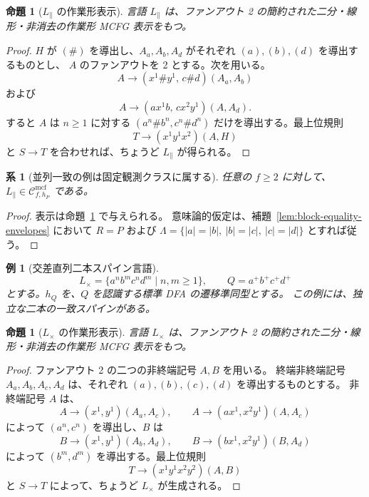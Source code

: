 \documentclass[11pt,a4paper]{ltjsarticle}
\newtheorem{proposition}[theorem]{命題}
\newtheorem{corollary}[theorem]{系}
\newtheorem{example}[theorem]{例}
\theoremstyle{remark}
\newcommand{\Cmcf}[2]{\mathcal{C}^{\mathrm{mcf}}_{#1,#2}}
\begin{document}
\begin{proposition}[\(L_{\parallel}\) の作業形表示]
\label{prop:parallel-running-example}
言語 \(L_{\parallel}\) は、ファンアウト 2 の簡約された二分・線形・非消去の作業形 MCFG 表示をもつ。
\end{proposition}

\begin{proof}
\(H\) が \((\#)\) を導出し、\(A_a,A_b,A_d\) がそれぞれ \((a),(b),(d)\) を導出するものとし、
\(A\) のファンアウトを 2 とする。次を用いる。
\[
  A\to(x^1\#y^1,\,c\#d)(A_a,A_b)
\]
および
\[
  A\to(a x^1 b,\,c x^2 y^1)(A,A_d).
\]
すると \(A\) は \(n\ge1\) に対する
\((a^n\#b^n,c^n\#d^n)\) だけを導出する。最上位規則
\[
  T\to(x^1y^1x^2)(A,H)
\]
と \(S\to T\) を合わせれば、ちょうど \(L_{\parallel}\) が得られる。
\end{proof}

\begin{corollary}[並列一致の例は固定観測クラスに属する]
\label{cor:parallel-in-fixed-observation-class}
任意の \(f\ge2\) に対して、\(L_{\parallel}\in\Cmcf{f}{h_P}\) である。
\end{corollary}

\begin{proof}
表示は命題~\ref{prop:parallel-running-example} で与えられる。
意味論的仮定は、補題~\ref{lem:block-equality-envelopes} において
\(R=P\) および
\(\Lambda=\{|a|=|b|,\ |b|=|c|,\ |c|=|d|\}\) とすれば従う。
\end{proof}

\begin{example}[交差直列二本スパイン言語]
\label{ex:cross-serial-language}
\[
  L_{\times}=\{a^n b^m c^n d^m\mid n,m\ge1\},
  \qquad Q=a^+b^+c^+d^+
\]
とする。\(h_Q\) を、\(Q\) を認識する標準 DFA の遷移準同型とする。
この例には、独立な二本の一致スパインがある。
\end{example}

\begin{proposition}[\(L_{\times}\) の作業形表示]
\label{prop:cross-serial-running-example}
言語 \(L_{\times}\) は、ファンアウト 2 の簡約された二分・線形・非消去の作業形 MCFG 表示をもつ。
\end{proposition}

\begin{proof}
ファンアウト 2 の二つの非終端記号 \(A,B\) を用いる。
終端非終端記号 \(A_a,A_b,A_c,A_d\) は、それぞれ \((a),(b),(c),(d)\) を導出するものとする。
非終端記号 \(A\) は、
\[
  A\to(x^1,y^1)(A_a,A_c),
  \qquad
  A\to(a x^1,x^2 y^1)(A,A_c)
\]
によって \((a^n,c^n)\) を導出し、\(B\) は
\[
  B\to(x^1,y^1)(A_b,A_d),
  \qquad
  B\to(b x^1,x^2 y^1)(B,A_d)
\]
によって \((b^m,d^m)\) を導出する。最上位規則
\[
  T\to(x^1y^1x^2y^2)(A,B)
\]
と \(S\to T\) によって、ちょうど \(L_{\times}\) が生成される。
\end{proof}
\end{document}
